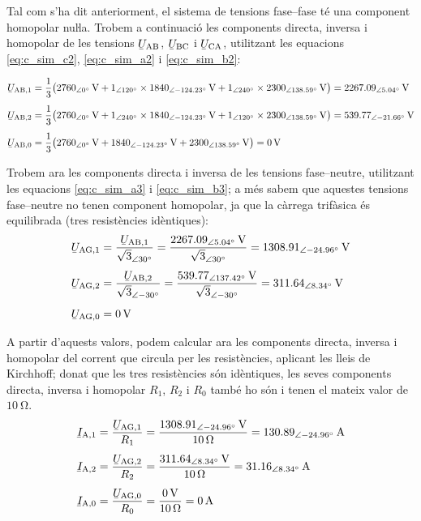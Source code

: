 \begin{exemple}
    Tal com s'ha dit anteriorment, el sistema de tensions fase--fase   té una component homopolar nuŀla.     Trobem a continuació les components directa, inversa i homopolar de les
    tensions $\cmplx{U}\ped{AB}$, $\cmplx{U}\ped{BC}$ i
    $\cmplx{U}\ped{CA}$, utilitzant les equacions
    \eqref{eq:c_sim_c2}, \eqref{eq:c_sim_a2} i \eqref{eq:c_sim_b2}:

    \begin{align*}
    \cmplx{U}\ped{AB,1} &= \frac{1}{3} \big(
    \SIpd{2760}{0}{V} + \numpd{1}{120} \times \SIpd{1840}{-124,23}{V} +
    \numpd{1}{240} \times \SIpd{2300}{138,59}{V}\big) = \SIpd{2267,09}{5,04}{V} \\[1ex]
    \cmplx{U}\ped{AB,2} &= \frac{1}{3} \big(
    \SIpd{2760}{0}{V} + \numpd{1}{240} \times \SIpd{1840}{-124,23}{V} +
    \numpd{1}{120} \times \SIpd{2300}{138,59}{V} \big) = \SIpd{539,77}{-21,66}{V} \\[1ex]
    \cmplx{U}\ped{AB,0} &= \frac{1}{3} \big(
    \SIpd{2760}{0}{V} + \SIpd{1840}{-124,23}{V} + \SIpd{2300}{138,59}{V}\big) = \SI{0}{V}
    \end{align*}

    Trobem ara les components directa i inversa
    de les tensions fase--neutre, utilitzant les equacions
    \eqref{eq:c_sim_a3} i \eqref{eq:c_sim_b3}; a més sabem que aquestes tensions fase--neutre no
    tenen component homopolar, ja que la càrrega trifàsica és equilibrada
    (tres resistències idèntiques):
    \begin{align*}
        \cmplx{U}\ped{AG,1} &=
        \frac{\cmplx{U}\ped{AB,1}}{\sqrt{3}_{\angle\ang{30}}} =
        \frac{\SIpd{2267,09}{5,04}{V}}{\sqrt{3}_{\angle\ang{30}}} =
        \SIpd{1308,91}{-24,96}{V} \\[1ex]
        \cmplx{U}\ped{AG,2} &=
        \frac{\cmplx{U}\ped{AB,2}}{\sqrt{3}_{\angle\ang{-30}}} =
        \frac{\SIpd{539,77}{137,42}{V}}{\sqrt{3}_{\angle\ang{-30}}} =
        \SIpd{311,64}{8,34}{V} \\[1ex]
        \cmplx{U}\ped{AG,0} &= \SI{0}{V}
    \end{align*}


    A partir d'aquests valors, podem calcular ara les components
    directa, inversa i homopolar del corrent que circula per les
    resistències, aplicant les lleis de Kirchhoff; donat que les tres resistències són idèntiques, les seves  components    directa, inversa i homopolar $R_1$,  $R_2$ i $R_0$ també ho són i tenen el mateix valor de $\SI{10}{\ohm}$.
    \begin{align*}
    \cmplx{I}\ped{A,1} &=
    \frac{\cmplx{U}\ped{AG,1}}{R_1} =
    \frac{\SIpd{1308,91}{-24,96}{V}}{\SI{10}{\ohm}} =
    \SIpd{130,89}{-24,96}{A} \\[1ex]
    \cmplx{I}\ped{A,2} &=
    \frac{\cmplx{U}\ped{AG,2}}{R_2} =
    \frac{\SIpd{311,64}{8,34}{V}}{\SI{10}{\ohm}} =
    \SIpd{31,16}{8,34}{A} \\[1ex]
    \cmplx{I}\ped{A,0} &=
    \frac{\cmplx{U}\ped{AG,0}}{R_0} =
    \frac{\SI{0}{V}}{\SI{10}{\ohm}} =
    \SI{0}{A}
    \end{align*}


\end{exemple}
